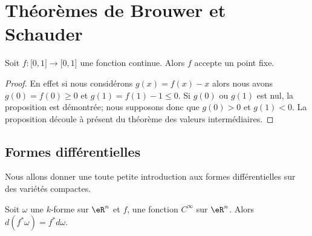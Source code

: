 
\section{Théorèmes de Brouwer et Schauder}

\begin{proposition}
    Soit \( f\colon \mathopen[ 0 , 1 \mathclose]\to \mathopen[ 0 , 1 \mathclose]\) une fonction continue. Alors \( f\) accepte un point fixe.
\end{proposition}

\begin{proof}
    En effet si nous considérons \( g(x)=f(x)-x\) alors nous avons \( g(0)=f(0)\geq 0\) et \( g(1)=f(1)-1\leq 0\). Si \( g(0)\) ou \( g(1)\) est nul, la proposition est démontrée; nous supposons donc que \( g(0)>0\) et \( g(1)<0\). La proposition découle à présent du théorème des valeurs intermédiaires.
\end{proof}

\subsection{Formes différentielles}

Nous allons donner une toute petite introduction aux formes différentielles sur des variétés compactes.

\begin{lemma}       \label{LemdwLGFG}
    Soit \( \omega\) une \( k\)-forme sur \( \eR^n\) et \( f\), une fonction \( C^{\infty}\) sur \( \eR^n\). Alors \( d(f^*\omega)=f^*d\omega\).
\end{lemma}

